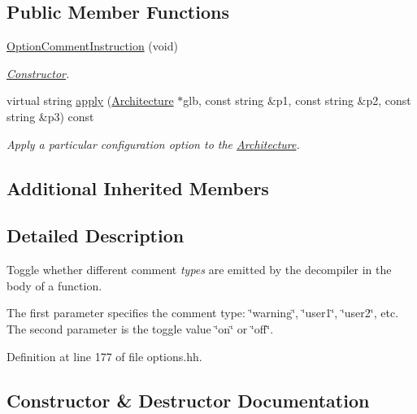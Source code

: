 \subsection*{Public Member Functions}
\begin{DoxyCompactItemize}
\item 
\mbox{\hyperlink{class_option_comment_instruction_a98f1a464627f2c75cf693cf27775d87b}{Option\+Comment\+Instruction}} (void)
\begin{DoxyCompactList}\small\item\em \mbox{\hyperlink{class_constructor}{Constructor}}. \end{DoxyCompactList}\item 
virtual string \mbox{\hyperlink{class_option_comment_instruction_afb67ac6097c2043acb256fd1d6935d95}{apply}} (\mbox{\hyperlink{class_architecture}{Architecture}} $\ast$glb, const string \&p1, const string \&p2, const string \&p3) const
\begin{DoxyCompactList}\small\item\em Apply a particular configuration option to the \mbox{\hyperlink{class_architecture}{Architecture}}. \end{DoxyCompactList}\end{DoxyCompactItemize}
\subsection*{Additional Inherited Members}


\subsection{Detailed Description}
Toggle whether different comment {\itshape types} are emitted by the decompiler in the body of a function. 

The first parameter specifies the comment type\+: \char`\"{}warning\char`\"{}, \char`\"{}user1\char`\"{}, \char`\"{}user2\char`\"{}, etc. The second parameter is the toggle value \char`\"{}on\char`\"{} or \char`\"{}off\char`\"{}. 

Definition at line 177 of file options.\+hh.



\subsection{Constructor \& Destructor Documentation}
\mbox{\label{class_option_comment_instruction_a98f1a464627f2c75cf693cf27775d87b}} 
